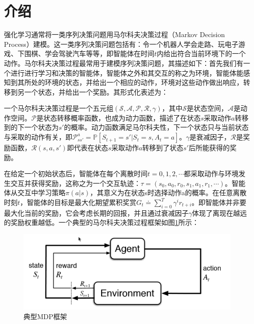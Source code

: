 \documentclass[lang=cn,11pt,a4paper,cite=number]{elegantpaper}
\begin{document}
\section{介绍}
强化学习通常将一类序列决策问题用马尔科夫决策过程（Markov Decision Process）建模。这一类序列决策问题包括有：令一个机器人学会走路、玩电子游戏、下围棋、学会驾驶汽车等等，即智能体在时间$t$内给出符合当前环境下的一个动作。马尔科夫决策过程最常用于建模序列决策问题，其描述如下：首先我们有一个进行进行学习和决策的智能体，智能体之外和其交互的称之为环境，智能体能感知到其所处的环境的状态，并给出一个相应的动作，环境对这些动作做出响应，转移到另一个状态，并给出一个奖励。其形式化表述为：
\begin{definition}
	一个马尔科夫决策过程是一个五元组$(\mathcal{S},\mathcal{A},\mathcal{P},\mathcal{R},\gamma)$，其中$\mathcal{S}$是状态空间，$\mathcal{A}$是动作空间。$\mathcal{P}$是状态转移概率函数，也成为动力函数，描述了在状态$s$采取动作$a$转移到的下一个状态为$s'$的概率。动力函数满足马尔科夫性，下一个状态只与当前状态与采取的动作有关，即$\mathcal{P}_{ss'}^a=\mathbb{P}[S_{t+1}=s'|S_t=s,A_t=a]$。$\gamma$是衰减因子，$\mathcal{R}$是奖励函数，$\mathcal{R}(s,a,s')$即代表在状态$s$采取动作$a$转移到了状态$s'$后所能获得的奖励。
\end{definition}
在给定一个初始状态后，智能体在每个离散时间$t=0,1,2,\cdots$都采取动作与环境发生交互并获得奖励，这称之为一个交互轨迹：$\tau=(s_0,a_0,r_0,s_{1},a_{1},r_{1},\cdots)$。智能体从交互中学习策略$\pi(a|s)$，其意义为在状态s时选择动作a的概率。在任意离散时刻$t$，智能体的目标是最大化期望累积奖赏$G_t\doteq\sum_{i=0}^T\gamma^{i} r_{t+i}$。即智能体并非要最大化当前的奖励，它会考虑长期的回报，并且通过衰减因子$\gamma$体现了离现在越远的奖励权重越低。一个典型的马尔科夫决策过程框架如图\ref{fig:fig1}所示：
\begin{figure}
	\centering
	\includegraphics[width=0.8\linewidth]{figure/fig1}
	\caption{典型MDP框架\cite{rl}}
	\label{fig:fig1}
\end{figure}
\end{document}
